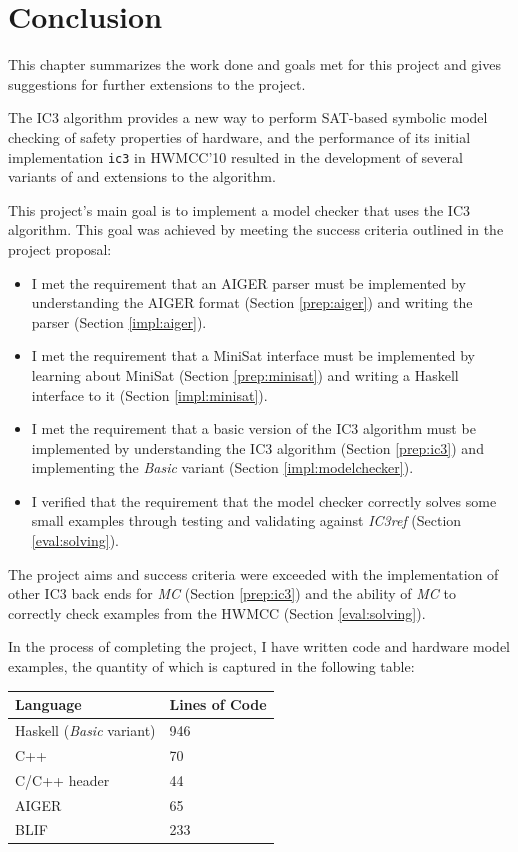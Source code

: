 \documentclass[12pt,a4paper,twoside,openright]{report}
\begin{document}
{{\chapter{Conclusion}
\label{conc}

This chapter summarizes the work done and goals met for this project and gives
suggestions for further extensions to the project.

The IC3 algorithm provides a new way to perform SAT-based symbolic model checking of
safety properties of hardware, and the performance of its initial implementation
\verb,ic3, in HWMCC'10 resulted in the development of several variants of
and extensions to the algorithm.

This project's main goal is to implement a model checker that uses the IC3 algorithm.
This goal was achieved by meeting the success criteria outlined in
the project proposal:

\begin{itemize}
\item I met the requirement that an AIGER parser must be implemented by understanding
the AIGER format (Section \ref{prep:aiger}) and writing the parser (Section
\ref{impl:aiger}).
\item I met the requirement that a MiniSat interface must be implemented by
learning about MiniSat (Section \ref{prep:minisat}) and writing a Haskell
interface to it (Section \ref{impl:minisat}).
\item I met the requirement that a basic version of the IC3 algorithm must be
implemented by
understanding the IC3 algorithm (Section \ref{prep:ic3}) and implementing the
\emph{Basic} variant (Section \ref{impl:modelchecker}).
\item I verified that the requirement that the model checker correctly solves some small
examples through testing and validating against \emph{IC3ref}
(Section \ref{eval:solving}).
\end{itemize}

The project aims and success criteria were exceeded with the implementation of other
IC3 back ends for \emph{MC} (Section \ref{prep:ic3})
and the ability of \emph{MC} to correctly check examples
from the HWMCC (Section \ref{eval:solving}).

In the process of completing the project, I have written code and hardware model
examples, the quantity of which is captured in the following table:
\begin{center}
\begin{tabular}{| l | l |}
\hline
Language & Lines of Code\\
\hline
Haskell (\emph{Basic} variant) & 946\\
C++ & 70\\
C/C++ header & 44\\
AIGER & 65\\
BLIF & 233\\
\hline
\end{tabular}
\end{center}

}}
\end{document}
